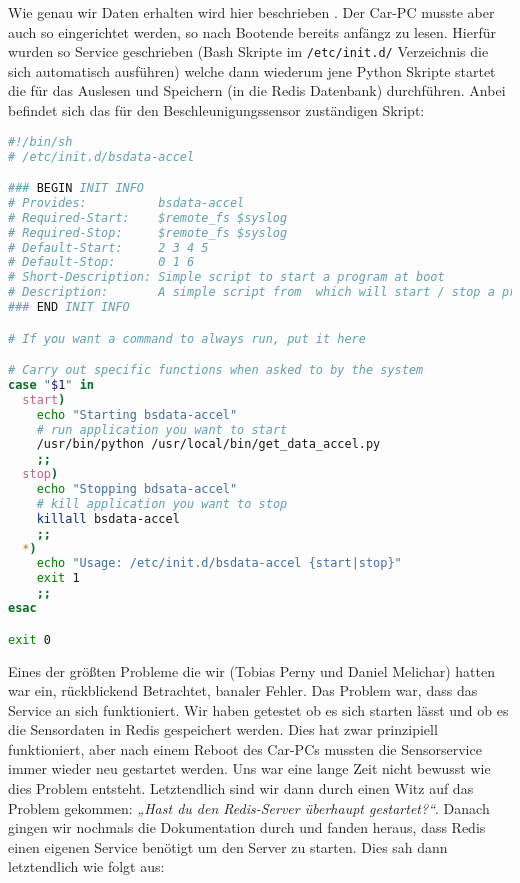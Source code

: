 Wie genau wir Daten erhalten wird hier beschrieben . Der Car-PC musste aber auch so eingerichtet werden, so nach Bootende bereits anfängz zu lesen. Hierfür wurden so Service geschrieben (Bash Skripte im \lstinline{/etc/init.d/} Verzeichnis die sich automatisch ausführen) welche dann wiederum jene Python Skripte startet die für das Auslesen und Speichern (in die Redis Datenbank) durchführen. Anbei befindet sich das für den Beschleunigungssensor zuständigen Skript:

\begin{lstlisting}[language=Bash, caption=Beschleunigungssensor Service]
#!/bin/sh
# /etc/init.d/bsdata-accel

### BEGIN INIT INFO
# Provides:          bsdata-accel
# Required-Start:    $remote_fs $syslog
# Required-Stop:     $remote_fs $syslog
# Default-Start:     2 3 4 5
# Default-Stop:      0 1 6
# Short-Description: Simple script to start a program at boot
# Description:       A simple script from  which will start / stop a program a boot / shutdown.
### END INIT INFO

# If you want a command to always run, put it here

# Carry out specific functions when asked to by the system
case "$1" in
  start)
    echo "Starting bsdata-accel"
    # run application you want to start
    /usr/bin/python /usr/local/bin/get_data_accel.py
    ;;
  stop)
    echo "Stopping bdsata-accel"
    # kill application you want to stop
    killall bsdata-accel
    ;;
  *)
    echo "Usage: /etc/init.d/bsdata-accel {start|stop}"
    exit 1
    ;;
esac

exit 0
\end{lstlisting}

\clearpage
Eines der größten Probleme die wir (Tobias Perny und Daniel Melichar) hatten war ein, rückblickend Betrachtet, banaler Fehler. Das Problem war, dass das Service an sich funktioniert. Wir haben getestet ob es sich starten lässt und ob es die Sensordaten in Redis gespeichert werden. Dies hat zwar prinzipiell funktioniert, aber nach einem Reboot des Car-PCs mussten die Sensorservice immer wieder neu gestartet werden. Uns war eine lange Zeit nicht bewusst wie dies Problem entsteht. Letztendlich sind wir dann durch einen Witz auf das Problem gekommen: \textit{„Hast du den Redis-Server überhaupt gestartet?“}. Danach gingen wir nochmals die Dokumentation durch und fanden heraus, dass Redis einen eigenen Service benötigt um den Server zu starten. Dies sah dann letztendlich wie folgt aus:

